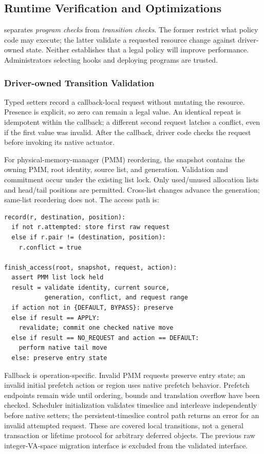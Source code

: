 \subsection{Runtime Verification and Optimizations}
\label{sec:verification}

\sys{} separates \emph{program checks} from \emph{transition checks}. The former restrict what policy code may execute; the latter validate a requested resource change against driver-owned state. Neither establishes that a legal policy will improve performance. Administrators selecting hooks and deploying programs are trusted.

\subsubsection{Driver-owned Transition Validation}

Typed setters record a callback-local request without mutating the resource. Presence is explicit, so zero can remain a legal value. An identical repeat is idempotent within the callback; a different second request latches a conflict, even if the first value was invalid. After the callback, driver code checks the request before invoking its native actuator.

For physical-memory-manager (PMM) reordering, the snapshot contains the owning PMM, root identity, source list, and generation. Validation and commitment occur under the existing list lock. Only used/unused allocation lists and head/tail positions are permitted. Cross-list changes advance the generation; same-list reordering does not. The access path is:

\begin{lstlisting}[language={},xleftmargin=0pt,numbers=none]
record(r, destination, position):
  if not r.attempted: store first raw request
  else if r.pair != (destination, position):
    r.conflict = true

finish_access(root, snapshot, request, action):
  assert PMM list lock held
  result = validate identity, current source,
           generation, conflict, and request range
  if action not in {DEFAULT, BYPASS}: preserve
  else if result == APPLY:
    revalidate; commit one checked native move
  else if result == NO_REQUEST and action == DEFAULT:
    perform native tail move
  else: preserve entry state
\end{lstlisting}

Fallback is operation-specific. Invalid PMM requests preserve entry state; an invalid initial prefetch action or region uses native prefetch behavior. Prefetch endpoints remain wide until ordering, bounds and translation overflow have been checked. Scheduler initialization validates timeslice and interleave independently before native setters; the persistent-timeslice control path returns an error for an invalid attempted request. These are covered local transitions, not a general transaction or lifetime protocol for arbitrary deferred objects. The previous raw integer-VA-space migration interface is excluded from the validated interface.

